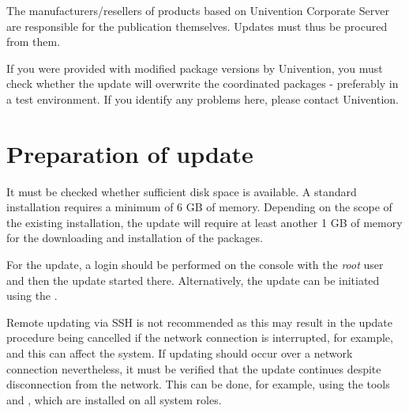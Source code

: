 The manufacturers/resellers of products based on Univention Corporate
Server are responsible for the publication themselves. Updates must
thus be procured from them.

If you were provided with modified package versions by Univention,
you must check whether the update will overwrite the coordinated
packages - preferably in a test environment. If you identify any
problems here, please contact Univention.


\chapter{Preparation of update}
It must be checked whether sufficient disk space is available. A
standard installation requires a minimum of 6 GB of memory. Depending
on the scope of the existing installation, the update will require at
least another 1 GB of memory for the downloading and installation of
the packages.

For the update, a login should be performed on the console with
the \emph{root} user and then the update started there. Alternatively,
the update can be initiated using the \ucsUMC{}.

Remote updating via SSH is not recommended as this may result in the
update procedure being cancelled if the network connection is
interrupted, for example, and this can affect the system. If updating
should occur over a network connection nevertheless, it must be
verified that the update continues despite disconnection from the
network. This can be done, for example, using the
tools  and , which are installed on
all system roles.

